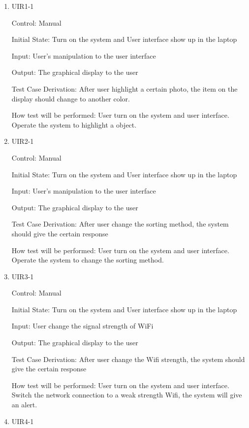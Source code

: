\documentclass[12pt, titlepage]{article}
\begin{document}
\begin{enumerate}

\item{UIR1-1\\}

Control: Manual
					
Initial State: Turn on the system and User interface show up in the laptop
					
Input: User's manipulation to the user interface
					
Output: The graphical display to the user

Test Case Derivation: After user highlight a certain photo, the item on the display should change to another color.
					
How test will be performed: 
	User turn on the system and user interface. Operate the system to highlight a object.		
	
	
\item{UIR2-1\\}

Control: Manual
					
Initial State: Turn on the system and User interface show up in the laptop
					
Input: User's manipulation to the user interface
					
Output: The graphical display to the user

Test Case Derivation: After user change the sorting method, the system should give the certain response
					
How test will be performed: 
	User turn on the system and user interface. Operate the system to change the sorting method.


\item{UIR3-1\\}

Control: Manual
					
Initial State: Turn on the system and User interface show up in the laptop
					
Input: User change the signal strength of WiFi
					
Output: The graphical display to the user

Test Case Derivation: After user change the Wifi strength, the system should give the certain response
					
How test will be performed: 
	User turn on the system and user interface. Switch the network connection to a weak strength Wifi, the system will give an alert.
	
\item{UIR4-1\\}


\end{enumerate}
\end{document}
